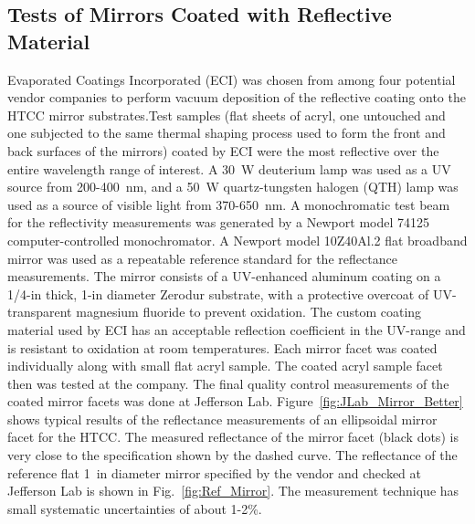 \subsection{Tests of Mirrors Coated with Reflective Material}

Evaporated Coatings Incorporated (ECI) was chosen from among four potential vendor companies to perform
vacuum deposition of the reflective coating onto the HTCC mirror substrates.Test samples (flat sheets of acryl,
one untouched and one subjected to the same thermal shaping process used to form the front and back surfaces of
the mirrors) coated by ECI were the most reflective over the entire wavelength range of interest. A 30~W
deuterium lamp was used as a UV source from 200-400~nm, and a 50~W quartz-tungsten halogen (QTH) lamp was
used as a source of visible light from 370-650~nm. A monochromatic test beam for the reflectivity measurements
was generated by a Newport model 74125 computer-controlled monochromator. A Newport model 10Z40Al.2 flat
broadband mirror was used as a repeatable reference standard for the reflectance measurements. The mirror
consists of a UV-enhanced aluminum coating on a 1/4-in thick, 1-in diameter Zerodur substrate, with a protective
overcoat of UV-transparent magnesium fluoride to prevent oxidation. The custom coating material used by ECI has
an acceptable reflection coefficient in the UV-range and is resistant to oxidation at room temperatures. Each mirror
facet was coated individually along with small flat acryl sample. The coated acryl sample facet  then was tested at the company. The final quality control measurements of the coated
mirror facets was done at Jefferson Lab. Figure~\ref{fig:JLab_Mirror_Better} shows typical results of the
reflectance  measurements of an ellipsoidal mirror facet for the HTCC. The measured reflectance of the mirror
facet (black dots) is very close to the specification shown by the dashed curve. The reflectance of the reference
flat 1~in diameter mirror specified by the vendor and checked at Jefferson Lab is shown in Fig.~\ref{fig:Ref_Mirror}.
The measurement technique has small systematic uncertainties of about 1-2\%.

